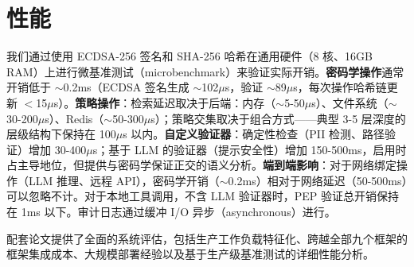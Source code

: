 \section{性能}
\label{sec:performance}

我们通过使用 ECDSA-256 签名和 SHA-256 哈希在通用硬件（8 核、16GB RAM）上进行微基准测试（microbenchmark）来验证实际开销。\textbf{密码学操作}通常开销低于 $\sim$0.2ms（ECDSA 签名生成 $\sim$102$\mu$s，验证 $\sim$89$\mu$s，每次操作哈希链更新 $<$15$\mu$s）。\textbf{策略操作}：检索延迟取决于后端：内存（$\sim$5-50$\mu$s）、文件系统（$\sim$30-200$\mu$s）、Redis（$\sim$50-300$\mu$s）；策略交集取决于组合方式——典型 3-5 层深度的层级结构下保持在 100$\mu$s 以内。\textbf{自定义验证器}：确定性检查（PII 检测、路径验证）增加 30-400$\mu$s；基于 LLM 的验证器（提示安全性）增加 150-500ms，启用时占主导地位，但提供与密码学保证正交的语义分析。\textbf{端到端影响}：对于网络绑定操作（LLM 推理、远程 API），密码学开销（$\sim$0.2ms）相对于网络延迟（50-500ms）可以忽略不计。对于本地工具调用，不含 LLM 验证器时，PEP 验证总开销保持在 1ms 以下。审计日志通过缓冲 I/O 异步（asynchronous）进行。

配套论文提供了全面的系统评估，包括生产工作负载特征化、跨越全部九个框架的框架集成成本、大规模部署经验以及基于生产级基准测试的详细性能分析。
